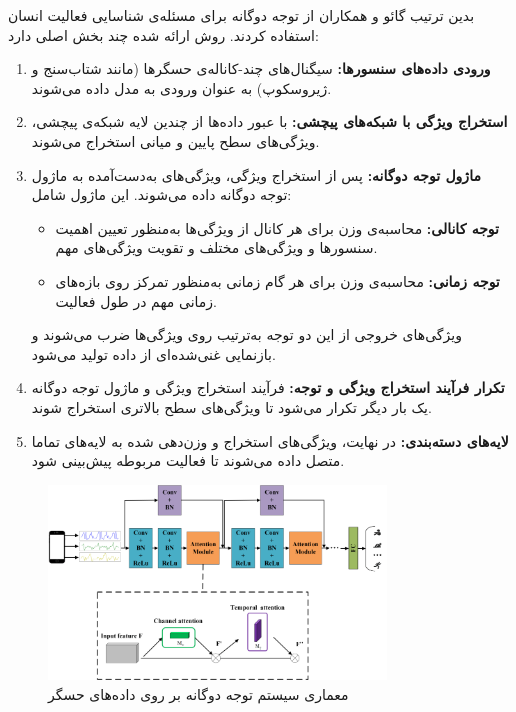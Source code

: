 بدین ترتیب گائو و همکاران از توجه دوگانه برای مسئله‌ی شناسایی فعالیت انسان استفاده کردند. روش ارائه شده چند بخش اصلی دارد:
\begin{enumerate}
    \item \textbf{ورودی داده‌های سنسورها:}
    سیگنال‌های چند-کاناله‌ی حسگرها (مانند شتاب‌سنج و ژیروسکوپ) به عنوان ورودی به مدل داده می‌شوند.

    \item \textbf{استخراج ویژگی با شبکه‌های پیچشی:}
    با عبور داده‌ها از چندین لایه شبکه‌ی پیچشی، ویژگی‌های سطح پایین و میانی استخراج می‌شوند.

    \item \textbf{ماژول توجه دوگانه:}
    پس از استخراج ویژگی، ویژگی‌های به‌دست‌آمده به ماژول توجه دوگانه داده می‌شوند. این ماژول شامل:
    \begin{itemize}
        \item \textbf{توجه کانالی:} محاسبه‌ی وزن برای هر کانال از ویژگی‌ها به‌منظور تعیین اهمیت سنسورها و ویژگی‌های مختلف و تقویت ویژگی‌های مهم.
        \item \textbf{توجه زمانی:} محاسبه‌ی وزن برای هر گام زمانی به‌منظور تمرکز روی بازه‌های زمانی مهم در طول فعالیت.
    \end{itemize}
    ویژگی‌های خروجی از این دو توجه به‌ترتیب روی ویژگی‌ها ضرب می‌شوند و بازنمایی غنی‌شده‌ای از داده تولید می‌شود.

    \item \textbf{تکرار فرآیند استخراج ویژگی و توجه:}
    فرآیند استخراج ویژگی و ماژول توجه دوگانه یک بار دیگر تکرار می‌شود تا ویژگی‌های سطح بالاتری استخراج شوند.

    \item \textbf{لایه‌های دسته‌بندی:}
    در نهایت، ویژگی‌های استخراج و وزن‌دهی شده به لایه‌های تماما متصل داده می‌شوند تا فعالیت مربوطه پیش‌بینی شود.
\end{enumerate}
\begin{figure}[htbp]
  \centering
  \includegraphics[width=0.8\textwidth]{Images/Chapter2/danhar.png}
  \caption{معماری سیستم توجه دوگانه بر روی داده‌های حسگر}
  \label{fig:danhar}
\end{figure}

